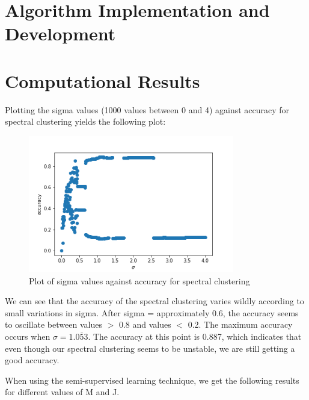 \documentclass[11pt]{amsart}
\begin{document}
\section{Algorithm Implementation and Development}\label{sec:algorithms}




\section{Computational Results}\label{sec:results}
Plotting the sigma values (1000 values between 0 and 4) against accuracy for spectral clustering yields the following plot: 
\begin{figure}[H]
    \centering
    \includegraphics[width=0.8\textwidth]{sigma_accuracy.png}
    \caption{Plot of sigma values against accuracy for spectral clustering}
    \label{fig:sigma_accuracy}
\end{figure}

We can see that the accuracy of the spectral clustering varies wildly according to small variations in 
sigma. After sigma = approximately 0.6, the accuracy seems to oscillate between values $>$ 0.8 and values
$<$ 0.2. The maximum accuracy occurs when $\sigma = 1.\overline{053}$. The accuracy at this point is 
0.887, which indicates that even though our spectral clustering seems to be unstable, we are still getting 
a good accuracy. 

When using the semi-supervised learning technique, we get the following results for different 
values of M and J.
\end{document}

